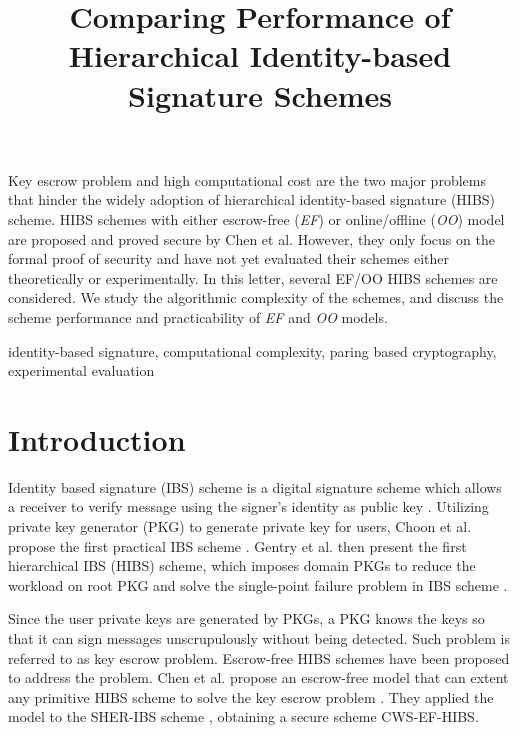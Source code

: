 \documentclass[letter]{ieice}
\title{Comparing Performance of Hierarchical Identity-based Signature Schemes}
\begin{document}
\maketitle
\begin{summary}
Key escrow problem and high computational cost are the two major problems that hinder the widely adoption of hierarchical identity-based signature (HIBS) scheme.
HIBS schemes with either escrow-free (\emph{EF}) or online/offline (\emph{OO}) model are proposed and proved secure by Chen et al.
However, they only focus on  the formal proof of security and have not yet evaluated their schemes either theoretically or experimentally.
In this letter, several EF/OO HIBS schemes are considered. 
We study the algorithmic complexity of the schemes, and discuss the scheme performance and practicability of \emph{EF} and \emph{OO} models.
\end{summary}
\begin{keywords}
identity-based signature, computational complexity, paring based cryptography, experimental evaluation
\end{keywords}

\section{Introduction}
Identity based signature (IBS) scheme is a digital signature scheme which allows a receiver to verify message using the signer's identity as public key \cite{shamir1985identity}. 
Utilizing private key generator (PKG) to generate private key for users, Choon et al. propose the first practical IBS scheme \cite{choon2002identity}. 
Gentry et al. then present the first hierarchical IBS (HIBS) scheme, which imposes domain PKGs to reduce the workload on root PKG and solve the single-point failure problem in IBS scheme \cite{gentry2002hierarchical}. 
\par

Since the user private keys are generated by PKGs, a PKG knows the keys so that it can sign messages unscrupulously without being detected.
Such problem is referred to as key escrow problem.
Escrow-free HIBS schemes have been proposed to address the problem. 
Chen et al. propose an escrow-free model that can extent any primitive HIBS scheme to solve the key escrow problem \cite{anescrowfree2015chen}. 
They applied the model to the SHER-IBS scheme \cite{chow2004secure}, obtaining a secure scheme CWS-EF-HIBS.
\par
\end{document}
